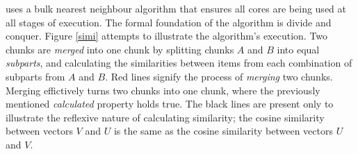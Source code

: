 \nr{} uses a bulk nearest neighbour algorithm that ensures all
cores are being used at all stages of execution.  The formal
foundation of the algorithm is divide and conquer.  Figure \ref{simi}
attempts to illustrate the algorithm's execution.  Two chunks are
{\it merged} into one chunk by splitting chunks $A$ and
$B$ into equal {\it subparts}, and calculating the similarities
between items from each combination of subparts from $A$ and $B$.
Red lines signify the process of {\it merging} two chunks.  Merging
effictively turns two chunks into one chunk, where the previously
mentioned {\it calculated} property holds true.
The black lines are present only to illustrate the reflexive nature
of calculating similarity; the cosine similarity between
vectors $V$ and $U$ is the same as the cosine similarity between
vectors $U$ and $V$.